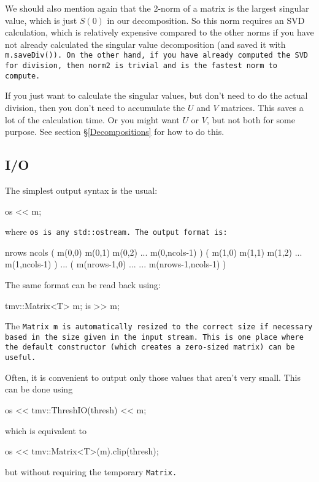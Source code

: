 We should also mention again that the 2-norm of a matrix is the 
largest singular value, which is just $S(0)$ in our decomposition.
So this norm requires an SVD calculation, 
which is relatively expensive compared to the other norms
if you have not already calculated the singular value decomposition
(and saved it with \tt{m.saveDiv()}).  On the other hand, if you have already
computed the SVD for division, then \tt{norm2} is trivial and is the 
fastest norm to compute.

If you just want to calculate the singular values,
but don't need to do the actual division, then you don't need to 
accumulate the $U$ and $V$ matrices.  This saves a lot of the 
calculation time.  Or you might want $U$ or $V$, but not both for 
some purpose.  See section \S\ref{Decompositions} for how to do this.

\subsection{I/O}
\label{Matrix_IO}

The simplest output syntax is the usual:
\begin{tmvcode}
os << m;
\end{tmvcode}
where \tt{os} is any \tt{std::ostream}.
The output format is:
\begin{tmvcode}
nrows ncols
( m(0,0)  m(0,1)  m(0,2)  ...  m(0,ncols-1) )
( m(1,0)  m(1,1)  m(1,2)  ...  m(1,ncols-1) )
...
( m(nrows-1,0) ...  ...  m(nrows-1,ncols-1) )
\end{tmvcode}

The same format can be read back using:
\begin{tmvcode}
tmv::Matrix<T> m;
is >> m;
\end{tmvcode}
The \tt{Matrix m} is automatically resized to the correct size if necessary based in the size given in the input stream.  This is one place where the default constructor (which creates a zero-sized matrix) can be useful.

Often, it is convenient to output only those values that aren't very small. 
This can be done using
\begin{tmvcode}
os << tmv::ThreshIO(thresh) << m;
\end{tmvcode}
which is equivalent to
\begin{tmvcode}
os << tmv::Matrix<T>(m).clip(thresh);
\end{tmvcode}
but without requiring the temporary \tt{Matrix}.

